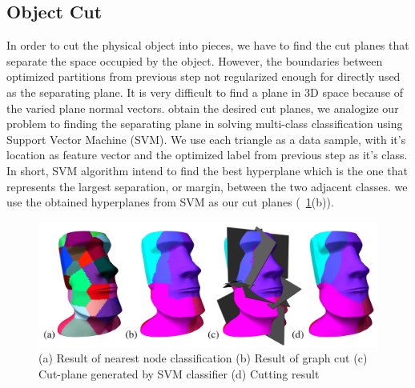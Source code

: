 \subsection{Object Cut}
In order to cut the physical object into pieces, we have to find the cut planes that separate the space occupied by the object.
However, the boundaries between optimized partitions from  previous step  not regularized enough for directly used as the separating plane. 
It is very difficult to find a plane in 3{D} space because of the varied plane normal vectors.
 obtain the desired cut planes, we analogize our problem to finding the separating plane in solving multi-class classification using Support Vector Machine (SVM).
We use each triangle as a data sample, with it's location as  feature vector and the optimized label from  previous step as it's class.
In short, SVM algorithm intend to find the best hyperplane which is the one that represents the largest separation, or margin, between the two adjacent classes. 
 we use the obtained hyperplanes from SVM as our cut planes (\figname~\ref{fig:cut_plane}(b)).


\begin{figure}[ht]
\centering
\includegraphics[width=1.0\linewidth]{figs/cut_plane2.pdf} 
\caption{(a) Result of nearest node classification (b) Result of graph cut (c) Cut-plane generated by SVM classifier (d) Cutting result} 
\label{fig:cut_plane}
\end{figure}

